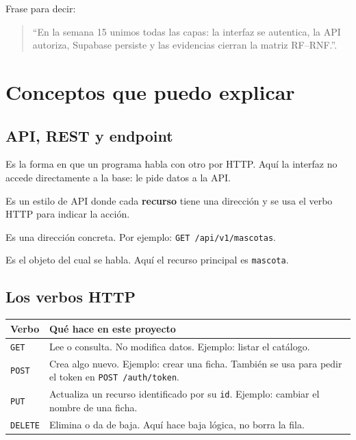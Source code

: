 \documentclass[11pt,a4paper]{article}
\newcommand{\code}[1]{\texttt{#1}}
\begin{document}
Frase para decir:

\begin{quote}
  ``En la semana 15 unimos todas las capas: la interfaz se autentica, la API
  autoriza, Supabase persiste y las evidencias cierran la matriz RF--RNF.''.
\end{quote}

\section{Conceptos que puedo explicar}

\subsection{API, REST y endpoint}

\begin{description}[leftmargin=*,style=nextline]
  \item[API.] Es la forma en que un programa habla con otro por HTTP. Aquí la
    interfaz no accede directamente a la base: le pide datos a la API.
  \item[REST.] Es un estilo de API donde cada \textbf{recurso} tiene una
    dirección y se usa el verbo HTTP para indicar la acción.
  \item[Endpoint.] Es una dirección concreta. Por ejemplo:
    \code{GET /api/v1/mascotas}.
  \item[Recurso.] Es el objeto del cual se habla. Aquí el recurso principal es
    \code{mascota}.
\end{description}

\subsection{Los verbos HTTP}

\begin{tabularx}{\linewidth}{@{}p{2.2cm}X@{}}
\toprule
\textbf{Verbo} & \textbf{Qué hace en este proyecto} \\
\midrule
\code{GET} & Lee o consulta. No modifica datos. Ejemplo: listar el catálogo. \\
\code{POST} & Crea algo nuevo. Ejemplo: crear una ficha. También se usa para
  pedir el token en \code{POST /auth/token}. \\
\code{PUT} & Actualiza un recurso identificado por su \code{id}. Ejemplo:
  cambiar el nombre de una ficha. \\
\code{DELETE} & Elimina o da de baja. Aquí hace baja lógica, no borra la fila. \\
\bottomrule
\end{tabularx}
\end{document}
